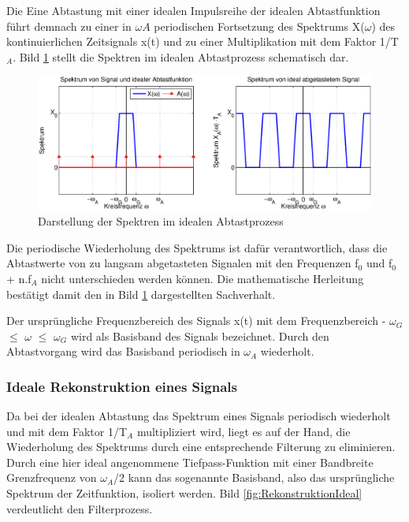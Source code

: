 \noindent Die Eine Abtastung mit einer idealen Impulsreihe der idealen Abtastfunktion führt demnach zu einer in $\omega{A}$ periodischen Fortsetzung des Spektrums X($\omega$) des kontinuierlichen Zeitsignals x(t) und zu einer Multiplikation mit dem Faktor 1/T${}_{A}$. Bild \ref{fig:AbtastprozessIdealSpektrum} stellt die Spektren im idealen Abtastprozess schematisch dar.

\begin{figure}[H]
  \centerline{\includegraphics[width=1\textwidth]{Kapitel1/Bilder/image6}}
  \caption{Darstellung der Spektren im idealen Abtastprozess}
  \label{fig:AbtastprozessIdealSpektrum}
\end{figure}

\noindent Die periodische Wiederholung des Spektrums ist dafür verantwortlich, dass die Abtastwerte von zu langsam abgetasteten Signalen mit den Frequenzen f${}_{0}$ und f${}_{0}$ + n$.$f${}_{A}$ nicht unterschieden werden können. Die mathematische Herleitung bestätigt damit den in Bild \ref{fig:AbtastprozessIdealSpektrum} dargestellten Sachverhalt.

\noindent Der ursprüngliche Frequenzbereich des Signals x(t) mit dem Frequenzbereich - $\omega_{G}$ $\leq$ $\omega$ $\leq$ $\omega_{G}$ wird als Basisband des Signals bezeichnet. Durch den Abtastvorgang wird das Basisband periodisch in $\omega_{A}$ wiederholt.


\subsubsection{Ideale Rekonstruktion eines Signals}

\noindent Da bei der idealen Abtastung das Spektrum eines Signals periodisch wiederholt und mit dem Faktor 1/T${}_{A}$ multipliziert wird, liegt es auf der Hand, die Wiederholung des Spektrums durch eine entsprechende Filterung zu eliminieren. Durch eine hier ideal angenommene Tiefpass-Funktion mit einer Bandbreite Grenzfrequenz von $\omega_{A}$/2 kann das sogenannte Basisband, also das ursprüngliche Spektrum der Zeitfunktion, isoliert werden. Bild \ref{fig:RekonstruktionIdeal} verdeutlicht den Filterprozess.


